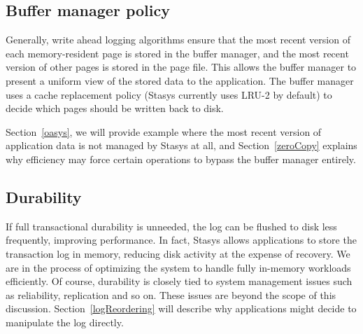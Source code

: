 \documentclass[letterpaper,twocolumn,10pt]{article}
\newcommand{\yad}{Stasys\xspace}
\newcommand{\eat}[1]{}
\begin{document}
\subsection{Buffer manager policy}

Generally, write ahead logging algorithms ensure that the most recent
version of each memory-resident page is stored in the buffer manager,
and the most recent version of other pages is stored in the page file.
This allows the buffer manager to present a uniform view of the stored
data to the application.  The buffer manager uses a cache replacement
policy (\yad currently uses LRU-2 by default) to decide which pages
should be written back to disk.

Section~\ref{oasys}, we will provide example where the most recent
version of application data is not managed by \yad at all, and
Section~\ref{zeroCopy} explains why efficiency may force certain
operations to bypass the buffer manager entirely.


\subsection{Durability}

\eat{\yad makes use of the same basic recovery strategy as existing
write-ahead-logging schemes such as ARIES.  Recovery consists of three
stages, {\em analysis}, {\em redo}, and {\em undo}.  Analysis is
essentially a performance optimization, and makes use of information
left during forward operation to reduce the cost of redo and undo.  It
also decides which transactions committed, and which aborted.  The
redo phase iterates over the log, applying the redo function of each
logged operation if necessary.  Once the log has been played forward,
the page file and buffer manager are in the same conceptual state they
were in at crash.  The undo phase simply aborts each transaction that
does not have a commit entry, exactly as it would during normal
operation.
}
If full transactional durability is
unneeded, the log can be flushed to disk less frequently, improving
performance.  In fact, \yad allows applications to store the
transaction log in memory, reducing disk activity at the expense of
recovery.  We are in the process of optimizing the system to handle
fully in-memory workloads efficiently.  Of course, durability is closely
tied to system management issues such as reliability, replication and so on.  
These issues are beyond the scope of this discussion.  Section~\ref{logReordering} will describe why applications might decide to manipulate the log directly.
\end{document}
